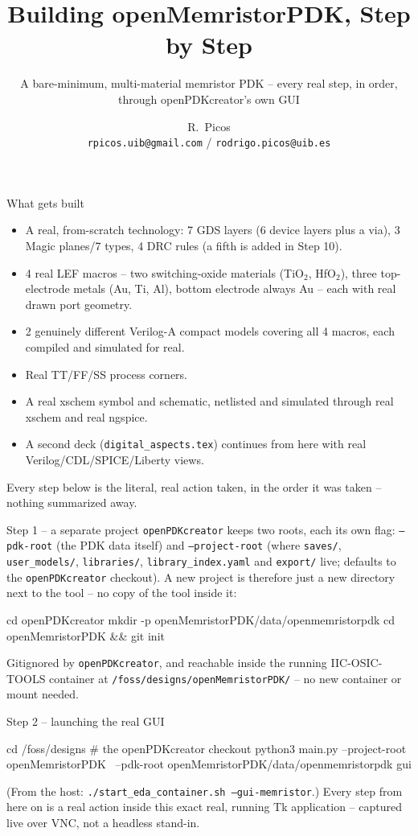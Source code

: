 \documentclass[aspectratio=169]{beamer}
\title{Building openMemristorPDK, Step by Step}
\subtitle{A bare-minimum, multi-material memristor PDK -- every real step, in order, through openPDKcreator's own GUI}
\author{R.~Picos\\{\small\texttt{rpicos.uib@gmail.com} / \texttt{rodrigo.picos@uib.es}}}
\institute{Project PID2025-170062NB (MemFRAME) funded by\\MICIU/AEI/10.13039/501100011033}
\date{}
\begin{document}
\frame{\titlepage}

\begin{frame}{What gets built}
\begin{itemize}
  \item A real, from-scratch technology: 7 GDS layers (6 device
        layers plus a via), 3 Magic planes/7 types, 4 DRC rules (a
        fifth is added in Step 10).
  \item 4 real LEF macros -- two switching-oxide materials
        (TiO$_2$, HfO$_2$), three top-electrode metals (Au, Ti, Al),
        bottom electrode always Au -- each with real drawn port
        geometry.
  \item 2 genuinely different Verilog-A compact models covering all 4
        macros, each compiled and simulated for real.
  \item Real TT/FF/SS process corners.
  \item A real xschem symbol and schematic, netlisted and simulated
        through real xschem and real ngspice.
  \item A second deck (\texttt{digital\_aspects.tex}) continues from
        here with real Verilog/CDL/SPICE/Liberty views.
\end{itemize}
Every step below is the literal, real action taken, in the order it
was taken -- nothing summarized away.
\end{frame}

\begin{frame}[fragile]{Step 1 -- a separate project}
\texttt{openPDKcreator} keeps two roots, each its own flag:
\texttt{--pdk-root} (the PDK data itself) and \texttt{--project-root}
(where \texttt{saves/}, \texttt{user\_models/}, \texttt{libraries/},
\texttt{library\_index.yaml} and \texttt{export/} live; defaults to the
\texttt{openPDKcreator} checkout). A new project is therefore just a
new directory next to the tool -- no copy of the tool inside it:
\begin{cli}
cd openPDKcreator
mkdir -p openMemristorPDK/data/openmemristorpdk
cd openMemristorPDK && git init
\end{cli}
Gitignored by \texttt{openPDKcreator}, and reachable inside the running
IIC-OSIC-TOOLS container at \texttt{/foss/designs/openMemristorPDK/} --
no new container or mount needed.
\end{frame}

\begin{frame}[fragile]{Step 2 -- launching the real GUI}
\begin{cli}
cd /foss/designs     # the openPDKcreator checkout
python3 main.py --project-root openMemristorPDK \
    --pdk-root openMemristorPDK/data/openmemristorpdk gui
\end{cli}
(From the host: \texttt{./start\_eda\_container.sh --gui-memristor}.)
Every step from here on is a real action inside this exact real,
running Tk application -- captured live over VNC, not a headless
stand-in.
\end{frame}
\end{document}
